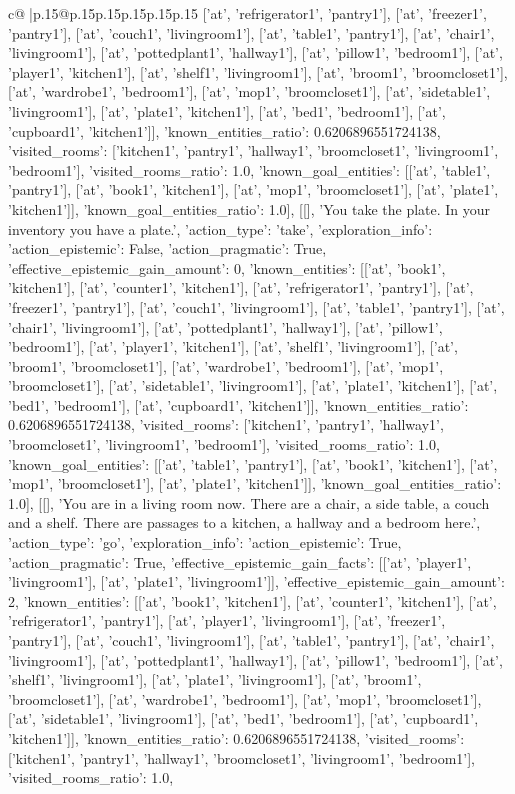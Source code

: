 \documentclass{article}
\begin{document}
{\begin{supertabular}{c@{$\;$}|p{.15\linewidth}@{}p{.15\linewidth}p{.15\linewidth}p{.15\linewidth}p{.15\linewidth}p{.15\linewidth}}
{{{['at', 'refrigerator1', 'pantry1'], ['at', 'freezer1', 'pantry1'], ['at', 'couch1', 'livingroom1'], ['at', 'table1', 'pantry1'], ['at', 'chair1', 'livingroom1'], ['at', 'pottedplant1', 'hallway1'], ['at', 'pillow1', 'bedroom1'], ['at', 'player1', 'kitchen1'], ['at', 'shelf1', 'livingroom1'], ['at', 'broom1', 'broomcloset1'], ['at', 'wardrobe1', 'bedroom1'], ['at', 'mop1', 'broomcloset1'], ['at', 'sidetable1', 'livingroom1'], ['at', 'plate1', 'kitchen1'], ['at', 'bed1', 'bedroom1'], ['at', 'cupboard1', 'kitchen1']], 'known_entities_ratio': 0.6206896551724138, 'visited_rooms': ['kitchen1', 'pantry1', 'hallway1', 'broomcloset1', 'livingroom1', 'bedroom1'], 'visited_rooms_ratio': 1.0, 'known_goal_entities': [['at', 'table1', 'pantry1'], ['at', 'book1', 'kitchen1'], ['at', 'mop1', 'broomcloset1'], ['at', 'plate1', 'kitchen1']], 'known_goal_entities_ratio': 1.0}}], [[], 'You take the plate. In your inventory you have a plate.', {'action_type': 'take', 'exploration_info': {'action_epistemic': False, 'action_pragmatic': True, 'effective_epistemic_gain_amount': 0, 'known_entities': [['at', 'book1', 'kitchen1'], ['at', 'counter1', 'kitchen1'], ['at', 'refrigerator1', 'pantry1'], ['at', 'freezer1', 'pantry1'], ['at', 'couch1', 'livingroom1'], ['at', 'table1', 'pantry1'], ['at', 'chair1', 'livingroom1'], ['at', 'pottedplant1', 'hallway1'], ['at', 'pillow1', 'bedroom1'], ['at', 'player1', 'kitchen1'], ['at', 'shelf1', 'livingroom1'], ['at', 'broom1', 'broomcloset1'], ['at', 'wardrobe1', 'bedroom1'], ['at', 'mop1', 'broomcloset1'], ['at', 'sidetable1', 'livingroom1'], ['at', 'plate1', 'kitchen1'], ['at', 'bed1', 'bedroom1'], ['at', 'cupboard1', 'kitchen1']], 'known_entities_ratio': 0.6206896551724138, 'visited_rooms': ['kitchen1', 'pantry1', 'hallway1', 'broomcloset1', 'livingroom1', 'bedroom1'], 'visited_rooms_ratio': 1.0, 'known_goal_entities': [['at', 'table1', 'pantry1'], ['at', 'book1', 'kitchen1'], ['at', 'mop1', 'broomcloset1'], ['at', 'plate1', 'kitchen1']], 'known_goal_entities_ratio': 1.0}}], [[], 'You are in a living room now. There are a chair, a side table, a couch and a shelf. There are passages to a kitchen, a hallway and a bedroom here.', {'action_type': 'go', 'exploration_info': {'action_epistemic': True, 'action_pragmatic': True, 'effective_epistemic_gain_facts': [['at', 'player1', 'livingroom1'], ['at', 'plate1', 'livingroom1']], 'effective_epistemic_gain_amount': 2, 'known_entities': [['at', 'book1', 'kitchen1'], ['at', 'counter1', 'kitchen1'], ['at', 'refrigerator1', 'pantry1'], ['at', 'player1', 'livingroom1'], ['at', 'freezer1', 'pantry1'], ['at', 'couch1', 'livingroom1'], ['at', 'table1', 'pantry1'], ['at', 'chair1', 'livingroom1'], ['at', 'pottedplant1', 'hallway1'], ['at', 'pillow1', 'bedroom1'], ['at', 'shelf1', 'livingroom1'], ['at', 'plate1', 'livingroom1'], ['at', 'broom1', 'broomcloset1'], ['at', 'wardrobe1', 'bedroom1'], ['at', 'mop1', 'broomcloset1'], ['at', 'sidetable1', 'livingroom1'], ['at', 'bed1', 'bedroom1'], ['at', 'cupboard1', 'kitchen1']], 'known_entities_ratio': 0.6206896551724138, 'visited_rooms': ['kitchen1', 'pantry1', 'hallway1', 'broomcloset1', 'livingroom1', 'bedroom1'], 'visited_rooms_ratio': 1.0, }}}
\end{supertabular}}
\end{document}
